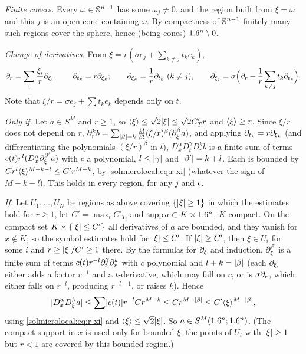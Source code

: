 \emph{Finite covers.} Every $\omega\in\mathbb{S}^{n-1}$ has some $\omega_j\ne0$, and the region built from
$\bar\xi=\omega$ and this $j$ is an open cone containing $\omega$. By compactness of $\mathbb{S}^{n-1}$ finitely
many such regions cover the sphere, hence (being cones) $1.6^n\setminus0$.

\emph{Change of derivatives.} From $\xi=r(\sigma e_j+\sum_{k\ne j}t_ke_k)$,
\begin{equation*}
  \partial_r=\sum_i\frac{\xi_i}r\partial_{\xi_i},\qquad\partial_{t_k}=r\partial_{\xi_k};\qquad
  \partial_{\xi_k}=\frac1r\partial_{t_k}\ (k\ne j),\qquad\partial_{\xi_j}=\sigma\Bigl(\partial_r-\frac1r\sum_{k\ne j}t_k\partial_{t_k}\Bigr).
\end{equation*}
Note that $\xi/r=\sigma e_j+\sum t_ke_k$ depends only on $t$.

\emph{Only if.} Let $a\in S^M$ and $r\ge1$, so $\langle \xi\rangle\le\sqrt2\lvert \xi\rvert\le\sqrt2C'_Tr$ and $\langle \xi\rangle\ge r$. Since
$\xi/r$ does not depend on $r$, $\partial_r^kb=\sum_{\lvert \beta\rvert=k}\frac{k!}{\beta!}(\xi/r)^\beta(\partial_\xi^\beta a)$, and applying
$\partial_{t_k}=r\partial_{\xi_k}$ (and differentiating the polynomials $(\xi/r)^\beta$ in $t$), $D^\alpha_xD^\gamma_tD^k_rb$ is a
finite sum of terms $c(t)r^l(D^\alpha_x\partial^{\beta'}_\xi a)$ with $c$ a polynomial, $l\le\lvert \gamma\rvert$ and
$\lvert \beta'\rvert=k+l$. Each is bounded by $Cr^l\langle \xi\rangle^{M-k-l}\le C'r^{M-k}$, by \eqref{solmicrolocal:eq:r-xi}
(whatever the sign of $M-k-l$). This holds in every region, for any $j$ and $\epsilon$.

\emph{If.} Let $U_1,\dots,U_N$ be regions as above covering $\{\lvert \xi\rvert\ge1\}$ in which the estimates hold for
$r\ge1$, let $C'=\max_iC'_{T_i}$ and $\operatorname{supp} a\subset K\times1.6^n$, $K$ compact. On the compact set
$K\times\{\lvert \xi\rvert\le C'\}$ all derivatives of $a$ are bounded, and they vanish for $x\notin K$; so the symbol
estimates hold for $\lvert \xi\rvert\le C'$. If $\lvert \xi\rvert\ge C'$, then $\xi\in U_i$ for some $i$ and
$r\ge\lvert \xi\rvert/C'\ge1$ there. By the formulas for $\partial_\xi$ and induction, $\partial^\beta_\xi$ is a finite sum of
terms $c(t)r^{-l}\partial_t^\gamma\partial_r^k$ with $c$ polynomial and $l+k=\lvert \beta\rvert$ (each $\partial_{\xi_i}$ either adds a factor
$r^{-1}$ and a $t$-derivative, which may fall on $c$, or is $\sigma\partial_r$, which either falls on $r^{-l}$,
producing $r^{-l-1}$, or raises $k$). Hence
\begin{equation*}
  \lvert D^\alpha_xD^\beta_\xi a\rvert\le\sum\lvert c(t)\rvert r^{-l}Cr^{M-k}\le Cr^{M-\lvert \beta\rvert}\le C'\langle \xi\rangle^{M-\lvert \beta\rvert},
\end{equation*}
using \eqref{solmicrolocal:eq:r-xi} and $\langle \xi\rangle\le\sqrt2\lvert \xi\rvert$. So $a\in S^M(1.6^n;1.6^n)$. (The compact
support in $x$ is used only for bounded $\xi$; the points of $U_i$ with $\lvert \xi\rvert\ge1$ but $r<1$ are
covered by this bounded region.)
